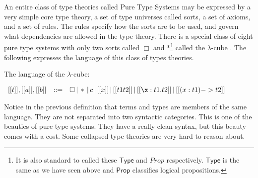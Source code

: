 An entire class of type theories called Pure Type Systems may be
expressed by a very simple core type theory, a set of type
universes called sorts, a set of axioms, and a set of rules.  The rules specify
how the sorts are to be used, and govern what dependencies are allowed
in the type theory.  There is a special class of eight pure type
systems with only two sorts called $\Box$ and $*$\footnote{ It is also
standard to called these $\mathsf{Type}$ and $Prop$ respectively.
$\mathsf{Type}$ is the same as we have seen above and $\mathsf{Prop}$
classifies logical propositions.} called the $\lambda$-cube \cite{Barendregt:1992}.  The
following expresses the language of this class of types theories.
\begin{definition}
  \label{def:pst_syntax}
  The language of the $\lambda$-cube:
  \begin{center}
    \begin{math}
      \begin{array}{lll}
        [[t]],[[a]],[[b]] & ::= & 
            \Box\,|\,*\,|\,c\,|\,[[x]]\,|\,[[t1 t2]]\,|\,[[\x:t1.t2]]\,|\,[[(x:t1)->t2]]\\
      \end{array}
    \end{math}
  \end{center}
\end{definition}
\noindent
Notice in the previous definition that terms and types are members of
the same language. They are not separated into two syntactic
categories.  This is one of the beauties of pure type systems.  They
have a really clean syntax, but this beauty comes with a cost.  Some
collapsed type theories are very hard to reason about.

